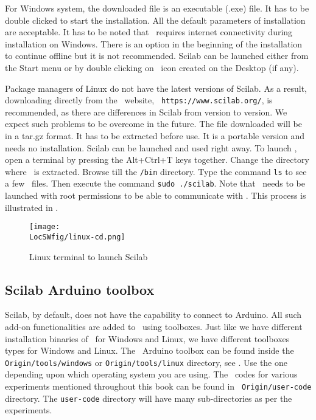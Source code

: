 For Windows system, the downloaded file is an executable (.exe) file.
It has to be double clicked to start the installation. All the default
parameters of installation are acceptable.  It has to be noted that
\scilab\ requires internet connectivity during installation on
Windows.  There is an option in the beginning of the installation to
continue offline but it is not recommended.  Scilab can be launched
either from the Start menu or by double clicking on \scilab\ icon
created on the Desktop (if any).

Package managers of Linux do not have the latest versions of Scilab.
As a result, downloading directly from the \scilab\ website, {\tt
            https://www.scilab.org/}, is recommended, as there are differences in
Scilab from version to version.  We expect such problems to be overcome
in the future.  The file downloaded will be in a tar.gz format.  It has
to be extracted before use.  It is a portable version and needs no
installation. Scilab can be launched and used right away.  To launch
\scilab, open a terminal by pressing the Alt+Ctrl+T keys
together. Change the directory where \scilab\ is extracted. Browse
till the {\tt /bin} directory. Type the command {\tt ls} to see a few
\scilab\ files.  Then execute the command {\tt sudo ./scilab}. Note
that \scilab\ needs to be launched with root permissions to be able to
communicate with \arduino. This process is illustrated in
.
\begin{figure}
      \centering
      \texttt{[image: \\LocSWfig/linux-cd.png]}
      \caption{Linux terminal to launch Scilab}
      \label{linux-cd}
\end{figure}

\subsection{Scilab Arduino toolbox}
Scilab, by default, does not have the capability to connect to
Arduino. All such add-on functionalities are added to \scilab\ using
toolboxes. Just like we have different installation binaries of
\scilab\ for Windows and Linux, we have different toolboxes types for
Windows and Linux. The \scilab\ Arduino toolbox can be found inside
the {\tt Origin/tools/windows} or {\tt Origin/tools/linux} directory,
see .  Use the one depending upon
which operating system you are using. The \scilab\ codes for various
experiments mentioned throughout this book can be found in {\tt
            Origin/user-code} directory. The {\tt user-code} directory will have
many sub-directories as per the experiments.

